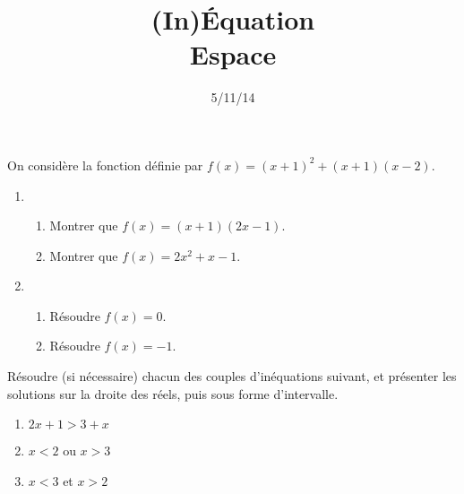 \documentclass[12pt]{article}
\title{(In)Équation\\Espace}
\date{5/11/14}
\begin{document}
\maketitle

\begin{exercice}
  On considère la fonction définie par $f(x)=\left( x+1 \right)^2+\left( x+1 \right)\left( x-2 \right)$.

  \begin{enumerate}[(1)]
    \item \begin{enumerate}

        \item Montrer que $f(x)=\left( x+1 \right)\left( 2x-1 \right)$.
        \item Montrer que $f(x)=2x^2+x-1$.
      \end{enumerate}
    \item \begin{enumerate}
        \item Résoudre $f(x)=0$.
        \item Résoudre $f(x)=-1$.
      \end{enumerate}
  \end{enumerate}
\end{exercice}

\begin{exercice}
  Résoudre (si nécessaire) chacun des couples d'inéquations suivant, et présenter les solutions sur la droite des réels, puis sous forme d'intervalle.
  \begin{enumerate}[(1)]
    \item $2x+1>3+x$
    \item $x<2$ ou $x>3$
    \item $x<3$ et $x>2$
  \end{enumerate}
\end{exercice}

\pagebreak
\end{document}
